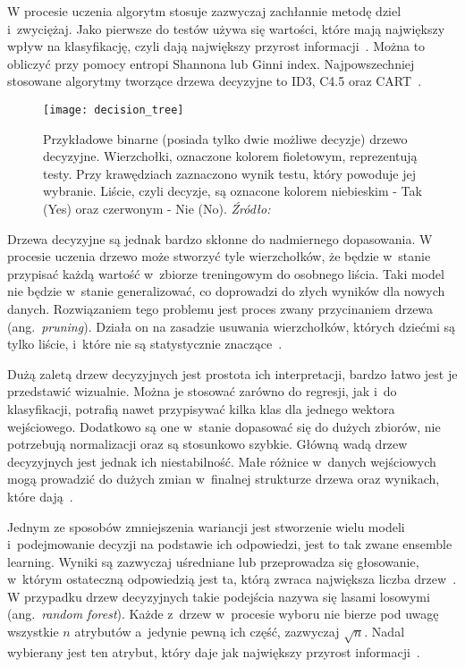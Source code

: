 W procesie uczenia algorytm stosuje zazwyczaj zachłannie metodę dziel i~zwyciężaj.
Jako pierwsze do testów używa się wartości, które mają największy wpływ na klasyfikację, czyli dają największy przyrost informacji~\cite{Russell2020}.
Można to obliczyć przy pomocy entropi Shannona lub Ginni index.
Najpowszechniej stosowane algorytmy tworzące drzewa decyzyjne to ID3, C4.5 oraz CART~\cite{Russell2020, Murphy2022}.

\begin{figure}[h]
    \centering
    \texttt{[image: decision\_tree]}
    \caption{Przykładowe binarne (posiada tylko dwie możliwe decyzje) drzewo decyzyjne. Wierzchołki, oznaczone kolorem fioletowym, reprezentują testy. Przy krawędziach zaznaczono wynik testu, który powoduje jej wybranie. Liście, czyli decyzje, są oznacone kolorem niebieskim - Tak (Yes) oraz czerwonym - Nie (No). \textit{Źródło:~\cite{Russell2020}}}
    \label{fig:decision-tree}
\end{figure}

Drzewa decyzyjne są jednak bardzo skłonne do nadmiernego dopasowania.
W procesie uczenia drzewo może stworzyć tyle wierzchołków, że będzie w~stanie przypisać każdą wartość w~zbiorze treningowym do osobnego liścia.
Taki model nie będzie w~stanie generalizować, co doprowadzi do złych wyników dla nowych danych.
Rozwiązaniem tego problemu jest proces zwany przycinaniem drzewa (ang.~\textit{pruning}).
Działa on na zasadzie usuwania wierzchołków, których dziećmi są tylko liście, i~które nie są statystycznie znaczące~\cite{Russell2020}.

Dużą zaletą drzew decyzyjnych jest prostota ich interpretacji, bardzo łatwo jest je przedstawić wizualnie.
Można je stosować zarówno do regresji, jak i~do klasyfikacji, potrafią nawet przypisywać kilka klas dla jednego wektora wejściowego.
Dodatkowo są one w~stanie dopasować się do dużych zbiorów, nie potrzebują normalizacji oraz są stosunkowo szybkie.
Główną wadą drzew decyzyjnych jest jednak ich niestabilność.
Małe różnice w~danych wejściowych mogą prowadzić do dużych zmian w~finalnej strukturze drzewa oraz wynikach, które dają~\cite{Murphy2022}.

Jednym ze sposobów zmniejszenia wariancji jest stworzenie wielu modeli i~podejmowanie decyzji na podstawie ich odpowiedzi, jest to tak zwane ensemble learning.
Wyniki są zazwyczaj uśredniane lub przeprowadza się głosowanie, w~którym ostateczną odpowiedzią jest ta, którą zwraca największa liczba drzew~\cite{Russell2020}.
W przypadku drzew decyzyjnych takie podejścia nazywa się lasami losowymi (ang.~\textit{random forest}).
Każde z~drzew w~procesie wyboru nie bierze pod uwagę wszystkie \(n\) atrybutów a~jedynie pewną ich część, zazwyczaj \(\sqrt{n}\).
Nadal wybierany jest ten atrybut, który daje jak największy przyrost informacji~\cite{Russell2020}.


